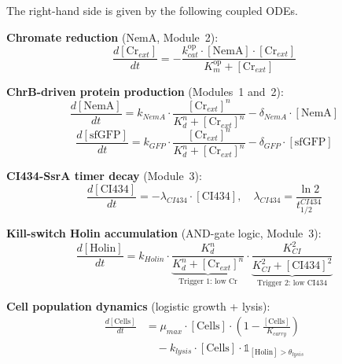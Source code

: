 \documentclass[10pt,twocolumn,letterpaper,
              colorlinks=true,
              linkcolor=blue!70!black,
              citecolor=blue!70!black,
              urlcolor=blue!70!black,
              pdfborder={0 0 0}]{article}
\begin{document}
The right-hand side is given by the following coupled ODEs.

\medskip
\noindent\textbf{Chromate reduction} (NemA, Module~2):
\begin{equation}
  \frac{d[\text{Cr}_{ext}]}{dt}
  = -\frac{k_{cat}^{\text{op}} \cdot [\text{NemA}] \cdot [\text{Cr}_{ext}]}
          {K_m^{\text{op}} + [\text{Cr}_{ext}]}
\end{equation}

\medskip
\noindent\textbf{ChrB-driven protein production} (Modules~1 and~2):
\begin{equation}
  \frac{d[\text{NemA}]}{dt}
  = k_{NemA} \cdot
    \frac{[\text{Cr}_{ext}]^n}{K_d^n + [\text{Cr}_{ext}]^n}
  - \delta_{NemA} \cdot [\text{NemA}]
\end{equation}
\begin{equation}
  \frac{d[\text{sfGFP}]}{dt}
  = k_{GFP} \cdot
    \frac{[\text{Cr}_{ext}]^n}{K_d^n + [\text{Cr}_{ext}]^n}
  - \delta_{GFP} \cdot [\text{sfGFP}]
\end{equation}

\medskip
\noindent\textbf{CI434-SsrA timer decay} (Module~3):
\begin{equation}
  \frac{d[\text{CI434}]}{dt}
  = -\lambda_{CI434} \cdot [\text{CI434}],
  \quad
  \lambda_{CI434} = \frac{\ln 2}{t_{1/2}^{CI434}}
\end{equation}

\medskip
\noindent\textbf{Kill-switch Holin accumulation}
(AND-gate logic, Module~3):
\begin{equation}
  \frac{d[\text{Holin}]}{dt}
  = k_{Holin}
    \cdot \underbrace{
      \frac{K_d^n}{K_d^n + [\text{Cr}_{ext}]^n}
    }_{\text{Trigger~1: low Cr}}
    \cdot \underbrace{
      \frac{K_{CI}^2}{K_{CI}^2 + [\text{CI434}]^2}
    }_{\text{Trigger~2: low CI434}}
\end{equation}

\medskip
\noindent\textbf{Cell population dynamics}
(logistic growth + lysis):
\begin{equation}
\begin{aligned}
\frac{d[\text{Cells}]}{dt}
&= \mu_{max} \cdot [\text{Cells}]
\cdot \left(1 - \frac{[\text{Cells}]}{K_{carry}}\right) \\
&\quad - k_{lysis} \cdot [\text{Cells}]
\cdot \mathbb{1}_{[\text{Holin}] > \theta_{lysis}}
\end{aligned}
\end{equation}
\end{document}
